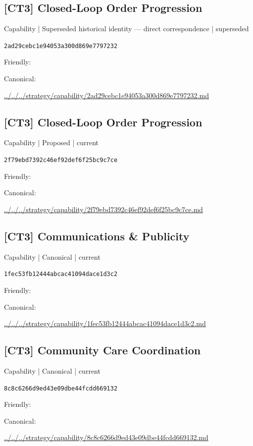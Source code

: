 \documentclass[10pt,a4paper]{article}
\begin{document}
\subsection*{[CT3] Closed-Loop Order Progression}
{\small Capability | Superseded historical identity — direct correspondence | superseded}\par
\texttt{2ad29cebc1e94053a300d869e7797232}\par
Friendly: \par
Canonical: \par
{\footnotesize\url{../../../strategy/capability/2ad29cebc1e94053a300d869e7797232.md}}\par
\subsection*{[CT3] Closed-Loop Order Progression}
{\small Capability | Proposed | current}\par
\texttt{2f79ebd7392c46ef92def6f25bc9c7ce}\par
Friendly: \par
Canonical: \par
{\footnotesize\url{../../../strategy/capability/2f79ebd7392c46ef92def6f25bc9c7ce.md}}\par
\subsection*{[CT3] Communications \& Publicity}
{\small Capability | Canonical | current}\par
\texttt{1fec53fb12444abcac41094dace1d3c2}\par
Friendly: \par
Canonical: \par
{\footnotesize\url{../../../strategy/capability/1fec53fb12444abcac41094dace1d3c2.md}}\par
\subsection*{[CT3] Community Care Coordination}
{\small Capability | Canonical | current}\par
\texttt{8c8c6266d9ed43e09dbe44fcdd669132}\par
Friendly: \par
Canonical: \par
{\footnotesize\url{../../../strategy/capability/8c8c6266d9ed43e09dbe44fcdd669132.md}}\par
\end{document}
